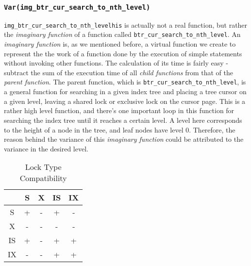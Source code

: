 \subsubsection{\texttt{Var(img\_btr\_cur\_search\_to\_nth\_level)}}
\texttt{img\_btr\_cur\_search\_to\_nth\_levelhis} is actually not a real
function, but rather the \textit{imaginary function} of a function called
\texttt{btr\_cur\_search\_to\_nth\_level}. An \textit{imaginary function} is,
as we mentioned before, a virtual function we create to represent the the work
of a function done by the execution of simple statements without invoking other
functions. The calculation of its time is fairly easy - subtract the sum of the
execution time of all \textit{child functions} from that of the \textit{parent
function}. The parent function, which is \texttt{btr\_cur\_search\_to\_nth\_level}, is a general function for searching in a given index tree and placing 
a tree cursor on a given level, leaving a shared lock or exclusive lock on the
cursor page. This is a rather high level function, and there's one important
loop in this function for searching the index tree until it reaches a certain
level. A level here corresponds to the height of a node in the tree, and leaf
nodes have level 0. Therefore, the reason behind the variance of this
\textit{imaginary function} could be attributed to the variance in the desired
level.

\begin{table}
\centering
\begin{tabular}{|c|c|c|c|c|} \hline
&S&X&IS&IX\\ \hline
S & + & - & + & -\\ \hline
X & - & - & - & -\\ \hline
IS & + & - & + & +\\ \hline
IX & - & - & + & +\\
\hline\end{tabular}
\caption{Lock Type Compatibility}
\label{tab:compatibility}
\end{table}


